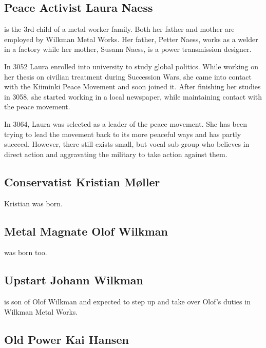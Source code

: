 \documentclass{tufte-book}
\begin{document}
\subsection{Peace Activist Laura Naess}
\label{sc:laura-naess}

 is the 3rd child of a metal worker family. Both her
father and mother are employed by Wilkman Metal Works. Her father, Petter
Naess, works as a welder in a factory while her mother, Susann Naess, is a
power transmission designer.

In 3052 Laura enrolled into university to study global politics. While working
on her thesis on civilian treatment during Succession Wars, she came into
contact with the Kiiminki Peace Movement and soon joined it. After finishing
her studies in 3058, she started working in a local newspaper, while
maintaining contact with the peace movement.

In 3064, Laura was selected as a leader of the peace movement. She has been
trying to lead the movement back to its more peaceful ways and has partly
succeed. However, there still exists small, but vocal sub-group who believes
in direct action and aggravating the military to take action against them.

\subsection{Conservatist Kristian M\o ller}
\label{sc:kristian-moller}

Kristian was born.

\subsection{Metal Magnate Olof Wilkman}
\label{sc:bio-olof-wilkman}

 was born too.

\subsection{Upstart Johann Wilkman}
\label{sc:bio-johann-wilkman}

 is son of Olof Wilkman and expected to step up
and take over Olof's duties in Wilkman Metal Works.

\subsection{Old Power Kai Hansen}
\label{sc:bio-kai-hansen}
\end{document}

